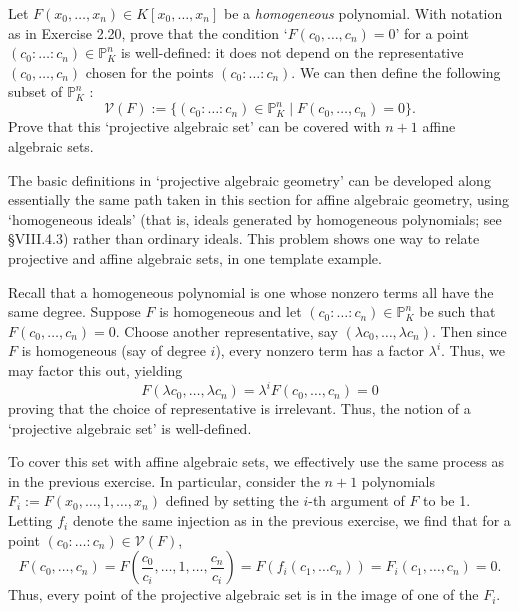 \documentclass[../../master.tex]{subfiles}
\begin{document}
\begin{problem}
    Let $F(x_0, \ldots, x_n) \in K[x_0, \ldots, x_n]$ be a \textit{homogeneous} polynomial.
    With notation as in Exercise 2.20, prove that the condition `$F(c_0, \ldots, c_n) = 0$' for a point $(c_0 : \ldots : c_n) \in \mathbb{P}^{n}_K$ is well-defined:
    it does not depend on the representative $(c_0, \ldots, c_n)$ chosen for the points $(c_0 : \ldots : c_n)$.
    We can then define the following subset of $\mathbb{P}^{n}_K$ :
    \[
        \mathscr{V}(F) := \{(c_0 : \ldots : c_n) \in \mathbb{P}^{n}_K \mid F(c_0, \ldots, c_n) = 0\}.
    \]
    Prove that this `projective algebraic set' can be covered with $n + 1$ affine algebraic sets.

    The basic definitions in `projective algebraic geometry' can be developed along essentially the same path taken in this section for affine algebraic geometry, using `homogeneous ideals' (that is, ideals generated by homogeneous polynomials; see \S VIII.4.3) rather than ordinary ideals.
    This problem shows one way to relate projective and affine algebraic sets, in one template example.
\end{problem}

\begin{solution}
    Recall that a homogeneous polynomial is one whose nonzero terms all have the same degree.
    Suppose $F$ is homogeneous and let $(c_0 : \ldots : c_n) \in \mathbb{P}^{n}_K$ be such that $F(c_0, \ldots, c_n) = 0$.
    Choose another representative, say $(\lambda c_0, \ldots, \lambda c_n)$.
    Then since $F$ is homogeneous (say of degree $i$), every nonzero term has a factor $\lambda^{i}$.
    Thus, we may factor this out, yielding
    \[
    F(\lambda c_0, \ldots, \lambda c_n) = \lambda^{i} F(c_0, \ldots, c_n) = 0
    \]
    proving that the choice of representative is irrelevant.
    Thus, the notion of a `projective algebraic set' is well-defined.

    To cover this set with affine algebraic sets, we effectively use the same process as in the previous exercise.
    In particular, consider the $n+1$ polynomials $F_i := F(x_0, \ldots, 1, \ldots, x_n)$ defined by setting the $i$-th argument of $F$ to be 1.
    Letting $f_i$ denote the same injection as in the previous exercise, we find that for a point $(c_0 : \ldots : c_n) \in \mathscr{V}(F)$, 
    \[
        F(c_0, \ldots, c_n) = F\left(\frac{c_0}{c_i}, \ldots, 1, \ldots, \frac{c_n}{c_i}\right) = F(f_i(c_1, \ldots c_n)) = F_i(c_1, \ldots, c_n) = 0.
    \]
    Thus, every point of the projective algebraic set is in the image of one of the $F_i$.
\end{solution}
\end{document}
